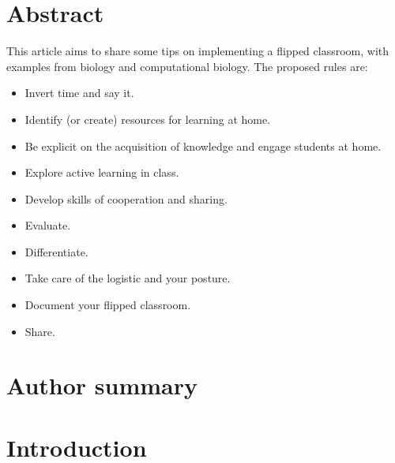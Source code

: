 \documentclass[10pt,letterpaper]{article}
\begin{document}
\section*{Abstract}

This article aims to share some tips on implementing a flipped classroom, with examples from biology and computational biology. 
The proposed rules are:

\begin{itemize}
\item Invert time and say it.
\item Identify (or create) resources for learning at home.
\item Be explicit on the acquisition of knowledge and engage students at home.
\item Explore active learning in class.
\item Develop skills of cooperation and sharing.
\item Evaluate.
\item Differentiate.
\item Take care of the logistic and your posture.
\item Document your flipped classroom.
\item Share.
\end{itemize}


\section*{Author summary}

\linenumbers

\section*{Introduction}
\end{document}

